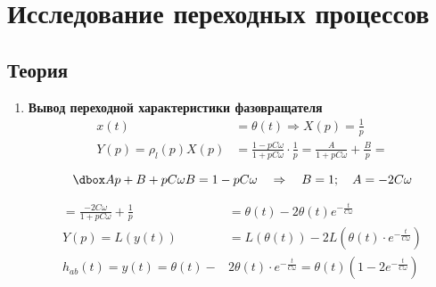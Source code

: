 \section{Исследование переходных процессов}
\subsection*{Теория}
\begin{enumerate}
\item\textbf{Вывод переходной характеристики фазовращателя}
\begin{align*}
x(t) &= \theta (t) \Rightarrow X(p) = \frac{1}{p} \\
Y(p) = \rho_l (p) X(p) &= \frac{1 - pC\omega}{1 + pC\omega} \cdot \frac{1}{p} = \frac{A}{1 + pC\omega} + \frac{B}{p} \boxed{=}
\end{align*}

\begin{equation*}
\dboxed{Ap + B + pC\omega B = 1-pC \omega \quad \Rightarrow \quad B = 1; \quad A = -2C\omega}
\end{equation*}

\begin{align*}
	\boxed{=} \frac{-2C\omega}{1 + pC\omega} + \frac{1}{p} &= \theta(t) - 2\theta(t) e^{-\frac{t}{C\omega}} \\
	Y(p) = L(y(t)) &= L(\theta(t)) - 2L(\theta(t) \cdot e^{-\frac{t}{C\omega}}) \\
	h_{ab}(t) = y(t) = \theta (t) - &2 \theta (t) \cdot e^{-\frac{t}{C\omega}} = \theta (t) (1 - 2 e^{-\frac{t}{C\omega}})
\end{align*}
	
\end{enumerate}
